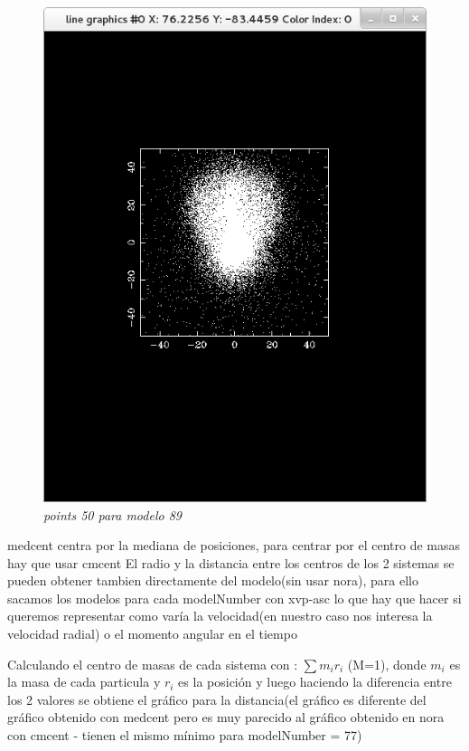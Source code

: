 \documentclass[12pt]{book}
\begin{document}
\begin{itemize}
\begin{figure}[h!]
 \centering
 \includegraphics[scale=0.5]{imgConModel89Points50.png}
 \caption{\emph{points 50 para modelo 89}}
 \label{Fig: 5}
\end{figure}

medcent centra por la mediana de posiciones, para centrar por el centro de masas hay que usar cmcent
El radio y la distancia entre los centros de los 2 sistemas se pueden obtener tambien directamente del modelo(sin usar nora), para ello sacamos los modelos para cada modelNumber con xvp-asc lo que hay que hacer si queremos representar como varía la velocidad(en nuestro caso nos interesa la velocidad radial) o el momento angular en el tiempo

Calculando el centro de masas de cada sistema con :
$\sum{m_ir_i}$ (M=1), donde $m_i$ es la masa de cada particula y $r_i$ es la posición 
y luego haciendo la diferencia entre los 2 valores se obtiene el gráfico para la distancia(el gráfico es diferente del gráfico obtenido con medcent pero es muy parecido al gráfico obtenido en nora con cmcent - tienen el mismo mínimo para modelNumber = 77)


\end{itemize}
\end{document}

